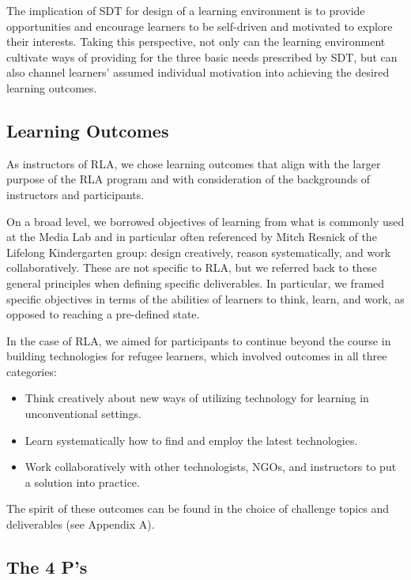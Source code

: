\documentclass[12pt,twoside]{mitthesis}
\begin{document}
The implication of SDT for design of a learning environment is to provide opportunities and encourage learners to be self-driven and motivated to explore their interests. Taking this perspective, not only can the learning environment cultivate ways of providing for the three basic needs prescribed by SDT, but can also channel learners' assumed individual motivation into achieving the desired learning outcomes.~\cite{selfdetermination}\cite{niemiec2009autonomy}

\subsection{Learning Outcomes}

As instructors of RLA, we chose learning outcomes that align with the larger purpose of the RLA program and with consideration of the backgrounds of instructors and participants. 

On a broad level, we borrowed objectives of learning from what is commonly used at the Media Lab and in particular often referenced by Mitch Resnick of the Lifelong Kindergarten group: design creatively, reason systematically, and work collaboratively. These are not specific to RLA, but we referred back to these general principles when defining specific deliverables. In particular, we framed specific objectives in terms of the abilities of learners to think, learn, and work, as opposed to reaching a pre-defined state.~\cite{roleofmaking}

In the case of RLA, we aimed for participants to continue beyond the course in building technologies for refugee learners, which involved outcomes in all three categories:
\begin{itemize}
\item Think creatively about new ways of utilizing technology for learning in unconventional settings.
\item Learn systematically how to find and employ the latest technologies.
\item Work collaboratively with other technologists, NGOs, and instructors to put a solution into practice.
\end{itemize}
The spirit of these outcomes can be found in the choice of challenge topics and deliverables (see Appendix A).

\subsection{The 4 P's}
\end{document}
